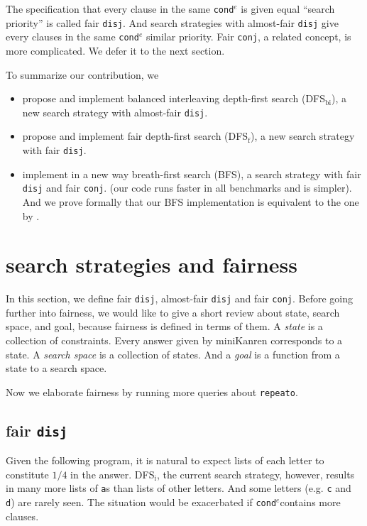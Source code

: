 \documentclass[format=acmlarge, review=true, authordraft=true]{acmart}
\newcommand{\conde}{\texttt{cond$^e$}}
\newcommand{\conj}{\texttt{conj}}
\newcommand{\disj}{\texttt{disj}}
\begin{document}
The specification that every clause in the same \conde{} is given equal 
``search priority'' is called fair \disj{}. And search strategies with 
almost-fair \disj{} give every clauses in the same \conde{} similar priority. 
Fair \conj{}, a related concept, is more complicated. We defer it to the next 
section.

To summarize our contribution, we
\begin{itemize}
	\item propose and implement balanced interleaving depth-first search 
	(DFS$_\textrm{bi}$), a new search strategy with almost-fair \disj{}.
	\item propose and implement fair depth-first search (DFS$_\textrm{f}$), a 
	new search strategy with fair \disj{}.
	\item implement in a new way breath-first search (BFS), a search strategy 
	with fair \disj{} and fair \conj{}. (our code runs faster in all 
benchmarks and is simpler). And we prove formally that our BFS implementation 
is equivalent to the one by \citet{seres1999algebra}.
\end{itemize}

\section{search strategies and fairness}

In this section, we define fair \disj{}, almost-fair \disj{} and fair \conj{}. 
Before going further into fairness, we would like to give a short review about 
state, search space, and goal, because fairness is defined in terms of them. 
A \emph{state} is a collection of constraints. Every answer given by 
miniKanren corresponds to a state. A \emph{search space} is a collection of 
states. And a \emph{goal} is a function from a state to a search space. 


Now we elaborate fairness by running more queries about \texttt{repeato}.

\subsection{fair \texttt{disj}}

Given the following program, it is natural to expect lists of each letter to
constitute $1/4$ in the answer. DFS$_\textrm{i}$, the current search
strategy, however, results in many more lists of \texttt{a}s than lists
of other letters. And some letters  (e.g. \texttt{c} and \texttt{d}) are
rarely seen. The situation would be exacerbated if \conde contains more clauses.
\end{document}
